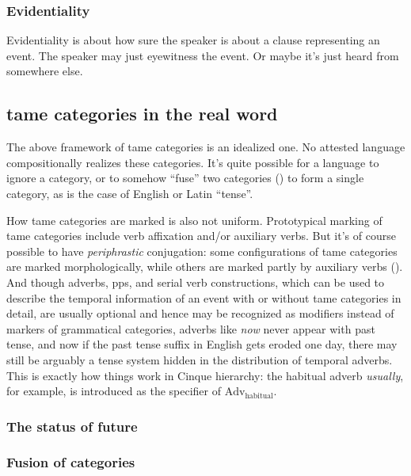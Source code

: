 \documentclass[UTF8, a4paper, oneside, scheme=plain]{ctexart}
\newcommand*{\corpus}[1]{\emph{#1}}
\begin{document}
\subsubsection{Evidentiality}

Evidentiality is about how sure the speaker is about a clause representing an event.
The speaker may just eyewitness the event.
Or maybe it's just heard from somewhere else.

\subsection{\ac{tame} categories in the real word}

The above framework of \ac{tame} categories is an idealized one.
No attested language compositionally realizes these categories.
It's quite possible for a language to ignore a category,
or to somehow ``fuse'' two categories ()
to form a single category,
as is the case of English or Latin ``tense''.

How \ac{tame} categories are marked is also not uniform.
Prototypical marking of \ac{tame} categories include 
verb affixation and/or auxiliary verbs.
But it's of course possible to have \emph{periphrastic} conjugation:
some configurations of \ac{tame} categories are marked morphologically,
while others are marked partly by auxiliary verbs ().
And though adverbs, \acs{pp}s, and serial verb constructions,
which can be used to describe the temporal information of an event 
with or without \ac{tame} categories in detail,
are usually optional 
and hence may be recognized as modifiers instead of markers of grammatical categories,
adverbs like \corpus{now} never appear with past tense,
and now if the past tense suffix in English gets eroded one day,
there may still be arguably a tense system
hidden in the distribution of temporal adverbs.
This is exactly how things work in Cinque hierarchy:
the habitual adverb \corpus{usually}, for example,
is introduced as the specifier of $\text{Adv}_{\text{habitual}}$.

\subsubsection{The status of future}

\subsubsection{Fusion of categories}\label{sec:fusion-of-tame}
\end{document}
